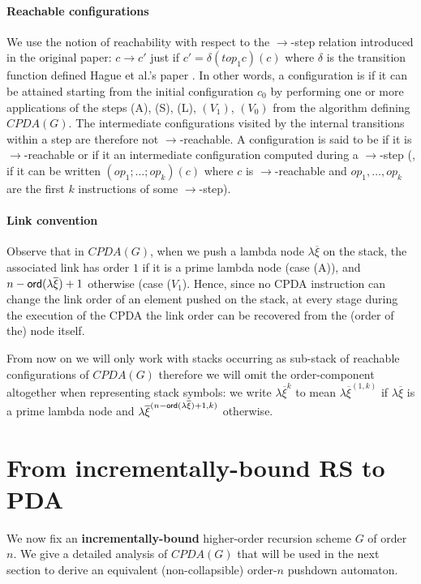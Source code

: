 \documentclass[a4paper,draft]{article}
\theoremstyle{remark}
\theoremstyle{definition}
\begin{document}
\paragraph{Reachable configurations}
We use the notion of reachability with respect to the $\rightarrow$-step relation introduced in the original paper:
$c\rightarrow c'$ just if $c' = \delta(top_1 c)(c)$ where $\delta$ is the transition
function defined Hague et al.'s paper \cite[Figure 2]{hague-collaps-full}.
In other words, a configuration is  if it can be attained starting from the initial configuration $c_0$ by performing
one or more applications of the steps (A), (S), (L), $(V_1)$, $(V_0)$ from the algorithm defining $CPDA(G)$.
The intermediate configurations visited by the internal transitions within a step are therefore not $\rightarrow$-reachable.
A configuration is said to be  if it is $\rightarrow$-reachable or if it
an intermediate configuration computed during a $\rightarrow$-step
(\ie, if it can be written $(op_1;\ldots;op_k)(c)$ where $c$ is $\rightarrow$-reachable and
$op_1, \ldots, op_k$ are the first $k$ instructions of some $\rightarrow$-step).

\paragraph{Link convention}
Observe that in $CPDA(G)$, when we push a lambda node $\lambda \overline{\xi}$ on the stack, the associated link has order $1$ if it is a prime lambda node (case (A)), and $n-{\sf ord}(\lambda \overline{\xi})+1$ otherwise (case ($V_1$). Hence, since no CPDA instruction can change the link order of an element pushed on the stack, at every stage during the execution of the CPDA the link order can be recovered from the (order of the) node itself.

From now on we will only work with stacks occurring as sub-stack of reachable configurations of $CPDA(G)$
therefore we will omit the order-component altogether when representing stack symbols: we write $\lambda\overline\xi^{k}$ to mean  $\lambda\overline\xi^{(1,k)}$ if $\lambda\overline\xi$ is a prime lambda node
and $\lambda\overline\xi^{(n-{\sf ord}(\lambda \overline{\xi})+1,k)}$ otherwise.

\section{From incrementally-bound RS to PDA}
 
We now fix an {\bf incrementally-bound} higher-order recursion scheme $G$ of order $n$.
We give a detailed analysis of $CPDA(G)$ that will be used in the next section to derive an equivalent (non-collapsible) order-$n$ pushdown automaton.
\end{document}
